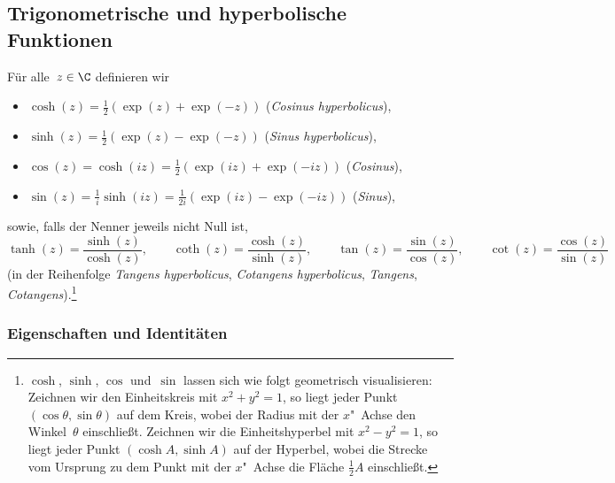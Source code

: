 \documentclass[a4paper]{article}
\begin{document}
\subsection{Trigonometrische und hyperbolische Funktionen}

\begin{definition}
    Für alle~$z \in \C$ definieren wir
    \begin{itemize}
        \item $\cosh(z) = \frac{1}{2}(\exp(z)+\exp(-z))$ (\emph{Cosinus hyperbolicus}),
        \item $\sinh(z) = \frac{1}{2}(\exp(z)-\exp(-z))$ (\emph{Sinus hyperbolicus}),
        \item $\cos(z) = \cosh(iz) = \frac{1}{2}(\exp(iz)+\exp(-iz))$ (\emph{Cosinus}),
        \item $\sin(z) = \frac{1}{i}\sinh(iz) = \frac{1}{2i}(\exp(iz)-\exp(-iz))$ (\emph{Sinus}),
    \end{itemize}
    sowie, falls der Nenner jeweils nicht Null ist,
    \begin{equation*}
        \tanh(z) = \frac{\sinh(z)}{\cosh(z)}, \qquad \coth(z) = \frac{\cosh(z)}{\sinh(z)}, \qquad \tan(z) = \frac{\sin(z)}{\cos(z)}, \qquad \cot(z) = \frac{\cos(z)}{\sin(z)}
    \end{equation*}
    (in der Reihenfolge \emph{Tangens hyperbolicus}, \emph{Cotangens hyperbolicus}, \emph{Tangens}, \emph{Cotangens}).\footnote{$\cosh$, $\sinh$, $\cos$ und~$\sin$ lassen sich wie folgt geometrisch visualisieren: Zeichnen wir den Einheitskreis mit $x^2+y^2 = 1$, so liegt jeder Punkt $(\cos\theta,\sin\theta)$ auf dem Kreis, wobei der Radius mit der $x$"~Achse den Winkel~$\theta$ einschließt. Zeichnen wir die Einheitshyperbel mit $x^2-y^2 = 1$, so liegt jeder Punkt $(\cosh A,\sinh A)$ auf der Hyperbel, wobei die Strecke vom Ursprung zu dem Punkt mit der $x$"~Achse die Fläche $\frac{1}{2}A$ einschließt.}
\end{definition}

\subsubsection{Eigenschaften und Identitäten}
\end{document}
